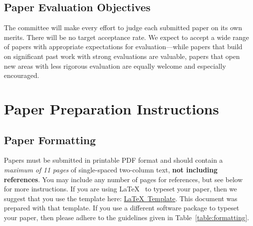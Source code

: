 \documentclass{sig-alternate}
\begin{document}
\subsection{Paper Evaluation Objectives} 
The committee will make every effort to judge each submitted paper on its own merits. There will be no target acceptance rate. We expect to accept a wide range of papers with appropriate expectations for evaluation---while papers that build on significant past work with strong evaluations are valuable, papers that open new areas with less rigorous evaluation are equally welcome and especially encouraged.

\section{Paper Preparation Instructions}

\subsection{Paper Formatting}

Papers must be submitted in printable PDF format and should contain a {\em maximum of 11 pages} of single-spaced two-column text, {\bf not including references}.  You may include any number of pages for references, but see below for more instructions.  If you are using \LaTeX~\cite{lamport94} to typeset your paper, then we suggest that you use the template here: \href{https://www.microarch.org/micro53/submit/micro53-latex-template.zip}{\LaTeX~Template}. This document was prepared with that template.  If you use a different software package to typeset your paper, then please adhere to the guidelines given in Table~\ref{table:formatting}. 
\end{document}
